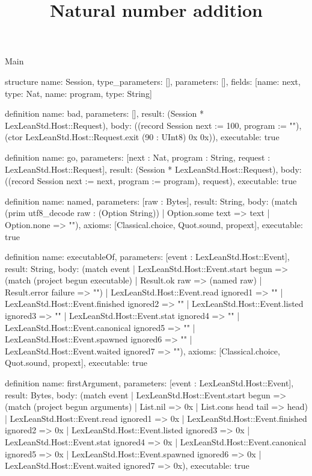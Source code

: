 \begin{lexlean}{Main}
\title{Natural number addition}
\begin{semanticmodule}
structure{
  name: Session,
  type_parameters: [],
  parameters: [],
  fields: [{name: next, type: Nat}, {name: program, type: String}]
}

definition{
  name: bad,
  parameters: [],
  result: (Session * LexLeanStd.Host::Request),
  body: ((record Session {next := 100, program := ""}), (ctor LexLeanStd.Host::Request.exit (90 : UInt8) 0x 0x)),
  executable: true
}

definition{
  name: go,
  parameters: [next : Nat, program : String, request : LexLeanStd.Host::Request],
  result: (Session * LexLeanStd.Host::Request),
  body: ((record Session {next := next, program := program}), request),
  executable: true
}

definition{
  name: named,
  parameters: [raw : Bytes],
  result: String,
  body: (match (prim utf8_decode raw : (Option String))
    | Option.some text => text
    | Option.none => ""),
  axioms: [Classical.choice, Quot.sound, propext],
  executable: true
}

definition{
  name: executableOf,
  parameters: [event : LexLeanStd.Host::Event],
  result: String,
  body: (match event
    | LexLeanStd.Host::Event.start begun => (match (project begun executable)
      | Result.ok raw => (named raw)
      | Result.error failure => "")
    | LexLeanStd.Host::Event.read ignored1 => ""
    | LexLeanStd.Host::Event.finished ignored2 => ""
    | LexLeanStd.Host::Event.listed ignored3 => ""
    | LexLeanStd.Host::Event.stat ignored4 => ""
    | LexLeanStd.Host::Event.canonical ignored5 => ""
    | LexLeanStd.Host::Event.spawned ignored6 => ""
    | LexLeanStd.Host::Event.waited ignored7 => ""),
  axioms: [Classical.choice, Quot.sound, propext],
  executable: true
}

definition{
  name: firstArgument,
  parameters: [event : LexLeanStd.Host::Event],
  result: Bytes,
  body: (match event
    | LexLeanStd.Host::Event.start begun => (match (project begun arguments)
      | List.nil => 0x
      | List.cons head tail => head)
    | LexLeanStd.Host::Event.read ignored1 => 0x
    | LexLeanStd.Host::Event.finished ignored2 => 0x
    | LexLeanStd.Host::Event.listed ignored3 => 0x
    | LexLeanStd.Host::Event.stat ignored4 => 0x
    | LexLeanStd.Host::Event.canonical ignored5 => 0x
    | LexLeanStd.Host::Event.spawned ignored6 => 0x
    | LexLeanStd.Host::Event.waited ignored7 => 0x),
  executable: true
}


\end{semanticmodule}
\end{lexlean}
